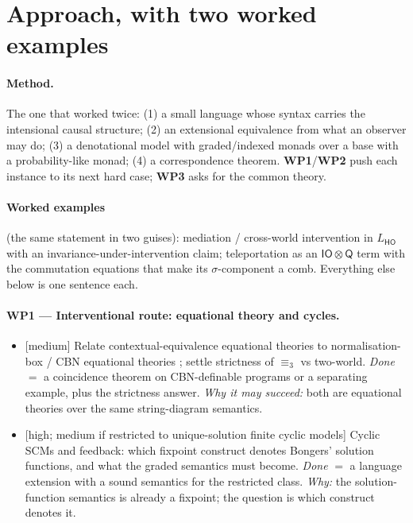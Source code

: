 \documentclass[11pt,a4paper]{article}
\newif\ifskeletonnotes
\newcommand{\sknote}[1]{\ifskeletonnotes{\small\color{blue!60!black}\textit{[#1]}}\fi}
\newcommand{\risk}[1]{\textsf{\small[#1]}}
\newcommand{\WP}[1]{\textbf{WP#1}}
\newcommand{\iotq}{\mathsf{IO}\otimes\mathsf{Q}}   %
\providecommand{\LHO}{L_{\mathsf{HO}}}
\begin{document}
\section{Approach, with two worked examples}\sknote{(iv); $2\frac12$ pages}
\paragraph{Method.} The one that worked twice: (1) a small language whose syntax carries the intensional causal structure; (2) an extensional equivalence from what an observer may do; (3) a denotational model with graded/indexed monads over a base with a probability-like monad; (4) a correspondence theorem. \WP{1}/\WP{2} push each instance to its next hard case; \WP{3} asks for the common theory.
\paragraph{Worked examples} (the same statement in two guises): mediation / cross-world intervention in $\LHO$ with an invariance-under-intervention claim; teleportation as an $\iotq$ term with the commutation equations that make its $\sigma$-component a comb. Everything else below is one sentence each.

\paragraph{\WP{1} --- Interventional route: equational theory and cycles.}
\begin{itemize}[nosep]
\item[1a] \risk{medium} Relate contextual-equivalence equational theories to normalisation-box / CBN equational theories \cite{jacobsszelesstein2025inference,agrawal2026equational}; settle strictness of $\equiv_3$ vs two-world. \emph{Done} $=$ a coincidence theorem on CBN-definable programs or a separating example, plus the strictness answer. \emph{Why it may succeed:} both are equational theories over the same string-diagram semantics.
\item[1b] \risk{high; medium if restricted to unique-solution finite cyclic models} Cyclic SCMs and feedback: which fixpoint construct denotes Bongers' solution functions, and what the graded semantics must become. \emph{Done} $=$ a language extension with a sound semantics for the restricted class. \emph{Why:} the solution-function semantics is already a fixpoint; the question is which construct denotes it.
\end{itemize}
\end{document}
